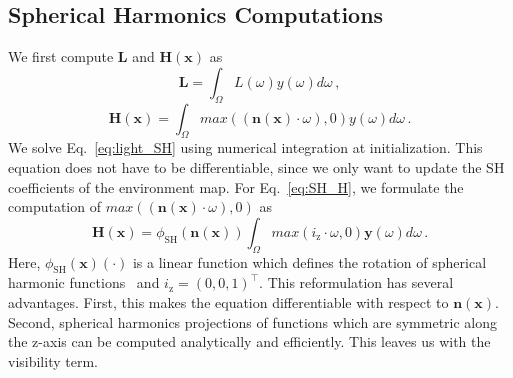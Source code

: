 \subsection{Spherical Harmonics Computations}
%
\label{sec:SH_compute}
%
We first compute $\boldsymbol{L}$ and $\boldsymbol{H(\mathbf{x})}$ as 
%
%
\begin{equation}
\label{eq:light_SH}
\boldsymbol{L}= \int_{\Omega} L(\omega) {y}(\omega) d \omega \,,
\end{equation} 
%
%
\begin{equation}
\label{eq:SH_H}
\boldsymbol{H(\mathbf{x})}= \int_{\Omega} max((\mathbf{n(\mathbf{x})} \cdot \omega),0) {y}(\omega) d \omega \,.
\end{equation} 
%
%
We solve Eq.~\ref{eq:light_SH} using numerical integration at initialization. 
%
This equation does not have to be differentiable, since we only want to update the SH coefficients of the environment map.
%
For Eq.~\ref{eq:SH_H}, we formulate the computation of $max((\mathbf{n(\mathbf{x})} \cdot \omega),0)$ as 
%
%
\begin{equation}
\label{eq:reparameterize}
\boldsymbol{H(\mathbf{x})}= \phi_\text{SH}(\mathbf{n(x)}) \int_{\Omega} max(i_\mathrm{z} \cdot \omega,0) \boldsymbol{y}(\omega) d \omega \,.
\end{equation} 
%
%
Here, $\phi_\text{SH}(\mathbf{x})(\cdot)$ is a linear function which defines the rotation of spherical harmonic functions~\cite{kautz2002fast} and $i_\mathrm{z}=(0,0,1)^\top$. 
%
This reformulation has several advantages. 
%
First, this makes the equation differentiable with respect to $\mathbf{n(x)}$.
%
Second, spherical harmonics projections of functions which are symmetric along the z-axis can be computed analytically and efficiently. 
%
This leaves us with the visibility term.
%
%
